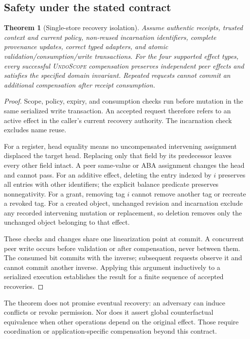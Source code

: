 \documentclass[10pt,twocolumn]{article}
\newtheorem{theorem}{Theorem}
\newcommand{\US}{\textsc{UndoScope}}
\begin{document}
\subsection{Safety under the stated contract}
\begin{theorem}[Single-store recovery isolation]
Assume authentic receipts, trusted context and current policy, non-reused incarnation identifiers, complete provenance updates, correct typed adapters, and atomic validation/consumption/write transactions. For the four supported effect types, every successful \US{} compensation preserves independent peer effects and satisfies the specified domain invariant. Repeated requests cannot commit an additional compensation after receipt consumption.
\end{theorem}
\begin{proof}
Scope, policy, expiry, and consumption checks run before mutation in the same serialized write transaction. An accepted request therefore refers to an active effect in the caller's current recovery authority. The incarnation check excludes name reuse.

For a register, head equality means no uncompensated intervening assignment displaced the target head. Replacing only that field by its predecessor leaves every other field intact. A peer same-value or ABA assignment changes the head and cannot pass. For an additive effect, deleting the entry indexed by $i$ preserves all entries with other identifiers; the explicit balance predicate preserves nonnegativity. For a grant, removing tag $i$ cannot remove another tag or recreate a revoked tag. For a created object, unchanged revision and incarnation exclude any recorded intervening mutation or replacement, so deletion removes only the unchanged object belonging to that effect.

These checks and changes share one linearization point at commit. A concurrent peer write occurs before validation or after compensation, never between them. The consumed bit commits with the inverse; subsequent requests observe it and cannot commit another inverse. Applying this argument inductively to a serialized execution establishes the result for a finite sequence of accepted recoveries.
\end{proof}

The theorem does not promise eventual recovery: an adversary can induce conflicts or revoke permission. Nor does it assert global counterfactual equivalence when other operations depend on the original effect. Those require coordination or application-specific compensation beyond this contract.
\end{document}
